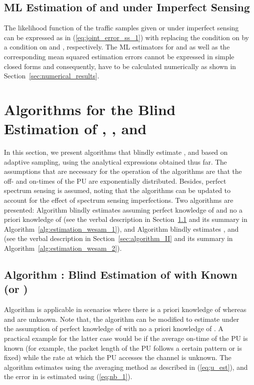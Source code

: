 \documentclass[11pt,draftclsnofoot,journal,onecolumn]{IEEEtran}
\begin{document}
\subsection{ML Estimation of  and  under Imperfect Sensing}
\label{sec:ml_lambda_se}

The likelihood function of the traffic samples given  or  under imperfect sensing can be expressed as in (\ref{eq;joint_error_ss_1}) with replacing the condition on  by a condition on  and , respectively. The ML estimators for  and  as well as the corresponding mean squared estimation errors cannot be expressed in simple closed forms and consequently, have to be calculated numerically as shown in Section~\ref{sec:numerical_results}.

\section{Algorithms for the Blind Estimation of , , and }
\label{sec:algorithm}

In this section, we present algorithms that blindly estimate ,  and  based on adaptive sampling, using the analytical expressions obtained thus far. The assumptions that are necessary for the operation of the algorithms are that the off- and on-times of the PU are exponentially distributed. Besides, perfect spectrum sensing is assumed, noting that the algorithms can be updated to account for the effect of spectrum sensing imperfections. Two algorithms are presented: Algorithm  blindly estimates  assuming perfect knowledge of  and no a priori knowledge of  (see the verbal description in Section~\ref{sec:algorithm_I} and its summary in Algorithm~\ref{alg:estimation_wesam_1}), and Algorithm  blindly estimates ,  and  (see the verbal description in Section~\ref{sec:algorithm_II} and its summary in Algorithm~\ref{alg:estimation_wesam_2}). 

\subsection{Algorithm : Blind Estimation of  with Known  (or )}
\label{sec:algorithm_I}

Algorithm  is applicable in scenarios where there is a priori knowledge of  whereas  and  are unknown. Note that, the algorithm can be modified to estimate  under the assumption of perfect knowledge of  with no a priori knowledge of . A practical example for the latter case would be if the average on-time of the PU is known (for example, the packet length of the PU follows a certain pattern or is fixed) while the rate at which the PU accesses the channel is unknown. The algorithm estimates  using the averaging method as described in (\ref{eq;u_est}), and the error in  is estimated using (\ref{eq;nb_1}).
\end{document}
